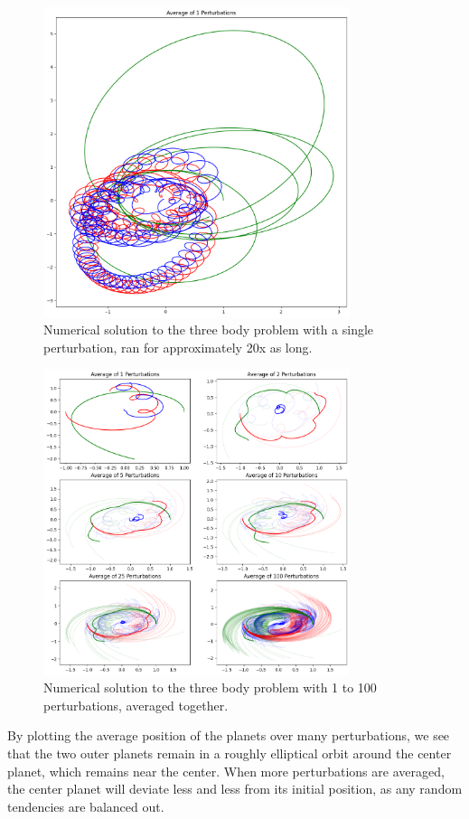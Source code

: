 \documentclass{article}
\begin{document}
\newpage
\begin{figure}[h!]
    \centering
    \includegraphics[width=0.8\textwidth]{Images/longrun.png}
    \caption{Numerical solution to the three body problem with a single perturbation, ran for approximately 20x as long.}
\end{figure}
\newpage
\begin{figure}[h!]
    \centering
    \includegraphics[width=0.8\textwidth]{Images/averages1to100.png}
    \caption{Numerical solution to the three body problem with 1 to 100 perturbations, averaged together.}
\end{figure}
By plotting the average position of the planets over many perturbations, we see that the two outer planets remain in a roughly elliptical orbit around the center planet, which remains near the center. When more perturbations are averaged, the center planet will deviate less and less from its initial position, as any random tendencies are balanced out.
\end{document}
